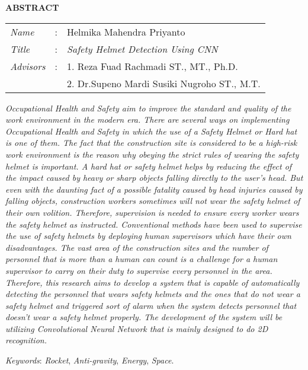 \begin{center}
  \large\textbf{ABSTRACT}
\end{center}


\vspace{2ex}

\begingroup
  \setlength{\tabcolsep}{0pt}

  \noindent
  \begin{tabularx}{\textwidth}{l >{\centering}m{3em} X}
    \emph{Name}     &:& Helmika Mahendra Priyanto \\

    \emph{Title}    &:& \emph{Safety Helmet Detection Using CNN} \\

    \emph{Advisors} &:& 1. Reza Fuad Rachmadi ST., MT., Ph.D. \\
                    & & 2. Dr.Supeno Mardi Susiki Nugroho ST., M.T. \\
  \end{tabularx}
\endgroup

\emph{
  Occupational Health and Safety aim to improve the standard and quality of the work environment in the modern era. There are several ways on implementing Occupational Health and Safety in which the use of a Safety Helmet or Hard hat is one of them. The fact that the construction site is considered to be a high-risk work environment is the reason why obeying the strict rules of wearing the safety helmet is important. A hard hat or safety helmet helps by reducing the effect of the impact caused by heavy or sharp objects falling directly to the user’s head. But even with the daunting fact of a possible fatality caused by head injuries caused by falling objects, construction workers sometimes will not wear the safety helmet of their own volition. Therefore, supervision is needed to ensure every worker wears the safety helmet as instructed. Conventional methods have been used to supervise the use of safety helmets by deploying human supervisors which have their own disadvantages. The vast area of the construction sites and the number of personnel that is more than a human can count is a challenge for a human supervisor to carry on their duty to supervise every personnel in the area. Therefore, this research aims to develop a system that is capable of automatically detecting the personnel that wears safety helmets and the ones that do not wear a safety helmet and triggered sort of alarm when the system detects personnel that doesn’t wear a safety helmet properly. The development of the system will be utilizing Convolutional Neural Network that is mainly designed to do 2D recognition. }

\emph{Keywords}: \emph{Rocket}, \emph{Anti-gravity}, \emph{Energy}, \emph{Space}.
